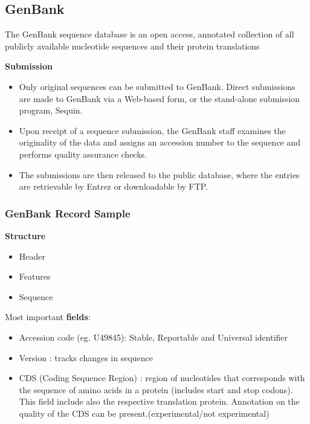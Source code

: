 \documentclass[11pt]{article}
\begin{document}
\subsection{GenBank}
\label{sec:orgc3befd7}
The GenBank sequence database is an open access, annotated collection of all publicly
available nucleotide sequences and their protein translations

\textbf{Submission}\\
\begin{itemize}
\item Only original sequences can be submitted to GenBank. Direct submissions are made to GenBank
via a Web-based form, or the stand-alone submission program, Sequin.
\item Upon receipt of a sequence submission, the GenBank staff examines the
originality of the data and assigns an accession number to the sequence and
performs quality assurance checks.
\item The submissions are then released to the public database, where the entries
are retrievable by Entrez or downloadable by FTP.
\end{itemize}


\subsubsection{GenBank Record Sample}
\label{sec:org2acabaa}
\textbf{Structure}
\begin{itemize}
\item Header
\item Features
\item Sequence
\end{itemize}


Most important \textbf{fields}:
\begin{itemize}
\item Accession code (eg. U49845): Stable, Reportable and Universal identifier
\item Version : tracks changes in sequence
\item CDS (Coding Sequence Region) : region of nucleotides that corresponds with the sequence of
amino acids in a protein (includes start and stop codons). This field include also the
respective translation protein. Annotation on the quality of the CDS can be
present.(experimental/not experimental)
\end{itemize}
\end{document}
